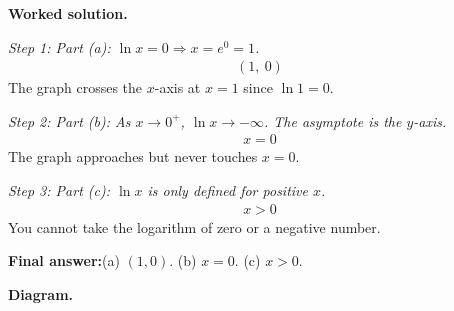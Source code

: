 \documentclass[11pt]{article}
\begin{document}
\textbf{Worked solution.}

\textit{Step 1: Part (a): \( \ln x = 0 \Rightarrow x = e^0 = 1 \).}
\[\begin{gathered}
(1,\ 0)
\end{gathered}\]
The graph crosses the \( x \)-axis at \( x = 1 \) since \( \ln 1 = 0 \).

\textit{Step 2: Part (b): As \( x \to 0^+ \), \( \ln x \to -\infty \). The asymptote is the \( y \)-axis.}
\[\begin{gathered}
x = 0
\end{gathered}\]
The graph approaches but never touches \( x = 0 \).

\textit{Step 3: Part (c): \( \ln x \) is only defined for positive \( x \).}
\[\begin{gathered}
x > 0
\end{gathered}\]
You cannot take the logarithm of zero or a negative number.

\begin{answerbox}
\textbf{Final answer:}\quad (a) \(\displaystyle  (1, 0) \). (b) \(\displaystyle  x = 0 \). (c) \(\displaystyle  x > 0 \).
\end{answerbox}
\textbf{Diagram.}
\end{document}
